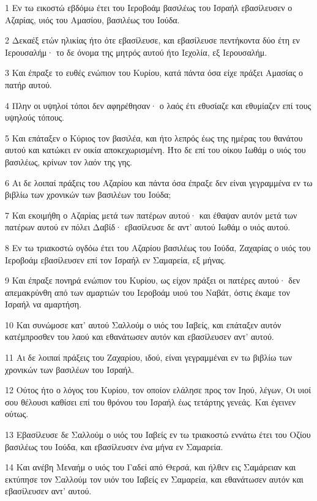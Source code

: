 \par 1 Εν τω εικοστώ εβδόμω έτει του Ιεροβοάμ βασιλέως του Ισραήλ εβασίλευσεν ο Αζαρίας, υιός του Αμασίου, βασιλέως του Ιούδα.
\par 2 Δεκαέξ ετών ηλικίας ήτο ότε εβασίλευσε, και εβασίλευσε πεντήκοντα δύο έτη εν Ιερουσαλήμ· το δε όνομα της μητρός αυτού ήτο Ιεχολία, εξ Ιερουσαλήμ.
\par 3 Και έπραξε το ευθές ενώπιον του Κυρίου, κατά πάντα όσα είχε πράξει Αμασίας ο πατήρ αυτού.
\par 4 Πλην οι υψηλοί τόποι δεν αφηρέθησαν· ο λαός έτι εθυσίαζε και εθυμίαζεν επί τους υψηλούς τόπους.
\par 5 Και επάταξεν ο Κύριος τον βασιλέα, και ήτο λεπρός έως της ημέρας του θανάτου αυτού και κατώκει εν οικία αποκεχωρισμένη. Ήτο δε επί του οίκου Ιωθάμ ο υιός του βασιλέως, κρίνων τον λαόν της γης.
\par 6 Αι δε λοιπαί πράξεις του Αζαρίου και πάντα όσα έπραξε δεν είναι γεγραμμένα εν τω βιβλίω των χρονικών των βασιλέων του Ιούδα;
\par 7 Και εκοιμήθη ο Αζαρίας μετά των πατέρων αυτού· και έθαψαν αυτόν μετά των πατέρων αυτού εν πόλει Δαβίδ· εβασίλευσε δε αντ' αυτού Ιωθάμ ο υιός αυτού.
\par 8 Εν τω τριακοστώ ογδόω έτει του Αζαρίου βασιλέως του Ιούδα, Ζαχαρίας ο υιός του Ιεροβοάμ εβασίλευσεν επί τον Ισραήλ εν Σαμαρεία, εξ μήνας.
\par 9 Και έπραξε πονηρά ενώπιον του Κυρίου, ως είχον πράξει οι πατέρες αυτού· δεν απεμακρύνθη από των αμαρτιών του Ιεροβοάμ υιού του Ναβάτ, όστις έκαμε τον Ισραήλ να αμαρτήση.
\par 10 Και συνώμοσε κατ' αυτού Σαλλούμ ο υιός του Ιαβείς, και επάταξεν αυτόν κατέμπροσθεν του λαού και εθανάτωσεν αυτόν και εβασίλευσεν αντ' αυτού.
\par 11 Αι δε λοιπαί πράξεις του Ζαχαρίου, ιδού, είναι γεγραμμέναι εν τω βιβλίω των χρονικών των βασιλέων του Ισραήλ.
\par 12 Ούτος ήτο ο λόγος του Κυρίου, τον οποίον ελάλησε προς τον Ιηού, λέγων, Οι υιοί σου θέλουσι καθίσει επί του θρόνου του Ισραήλ έως τετάρτης γενεάς. Και έγεινεν ούτως.
\par 13 Εβασίλευσε δε Σαλλούμ ο υιός του Ιαβείς εν τω τριακοστώ εννάτω έτει του Οζίου βασιλέως του Ιούδα, και εβασίλευσεν ένα μήνα εν Σαμαρεία.
\par 14 Και ανέβη Μεναήμ ο υιός του Γαδεί από Θερσά, και ήλθεν εις Σαμάρειαν και εκτύπησε τον Σαλλούμ τον υιόν του Ιαβείς εν Σαμαρεία, και εθανάτωσεν αυτόν και εβασίλευσεν αντ' αυτού.
